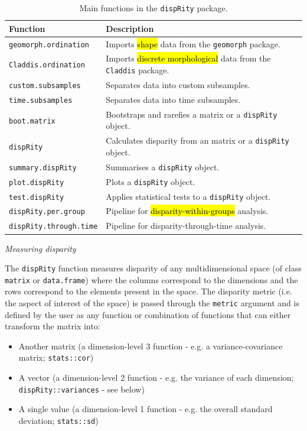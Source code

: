 \documentclass[12pt,letterpaper]{article}
\renewcommand{\subsection}[1]{%
\bigskip
\begin{center}
\begin{large}
\normalfont\itshape #1
\end{large}
\end{center}}
\newcommand{\disp}{\texttt{dispRity} }
\begin{document}
\begin{table}
    \begin{tabular}{ll}
        \hline
        Function & Description \\ 
        \hline
        \texttt{geomorph.ordination} & Imports \hl{shape} data from the \texttt{geomorph} package. \\
        \texttt{Claddis.ordination} & Imports \hl{discrete morphological} data from the \texttt{Claddis} package. \\
        \texttt{custom.subsamples} & Separates data into custom subsamples. \\
        \texttt{time.subsamples} & Separates data into time subsamples. \\
        \texttt{boot.matrix} & Bootstraps and rarefies a matrix or a \disp object. \\
        \disp & Calculates disparity from an matrix or a \disp object. \\
        \texttt{summary.dispRity} & Summarises a \disp object. \\
        \texttt{plot.dispRity} & Plots a \disp object. \\
        \texttt{test.dispRity} & Applies statistical tests to a \disp object.\\
        \texttt{dispRity.per.group} & Pipeline for \hl{disparity-within-groups} analysis. \\
        \texttt{dispRity.through.time} & Pipeline for disparity-through-time analysis. \\
        \hline
    \end{tabular}
    \caption{Main functions in the \disp package.}
    \label{Tab:main_fun}
\end{table}

\subsection{Measuring disparity}
The \disp function measures disparity of any multidimensional space (of class \texttt{matrix} or \texttt{data.frame}) where the columns correspond to the dimensions and the rows correspond to the elements present in the space.
The disparity metric (i.e. the aspect of interest of the space) is passed through the \texttt{metric} argument and is defined by the user as any function or combination of functions that can either transform the matrix into:

\begin{itemize}
    \item Another matrix (a dimension-level 3 function - e.g. a variance-covariance matrix; \texttt{stats::cor})
    \item A vector (a dimension-level 2 function - e.g. the variance of each dimension; \texttt{dispRity::variances} - see below)
    \item A single value (a dimension-level 1 function - e.g. the overall standard deviation; \texttt{stats::sd})
\end{itemize}
\end{document}

